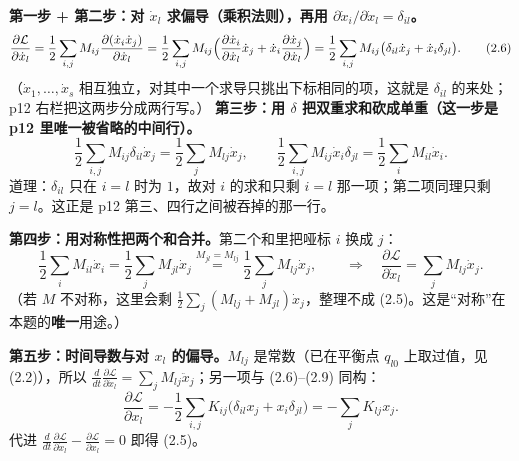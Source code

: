 \documentclass[11pt]{ctexart}
\begin{document}
\textbf{第一步 + 第二步：对 $\dot x_l$ 求偏导（乘积法则），再用 $\partial\dot x_i/\partial\dot x_l=\delta_{il}$。}
\[
\frac{\partial\mathcal{L}}{\partial\dot x_l}
=\frac12\sum_{i,j}M_{ij}\frac{\partial(\dot x_i\dot x_j)}{\partial\dot x_l}
=\frac12\sum_{i,j}M_{ij}\Bigl(\frac{\partial\dot x_i}{\partial\dot x_l}\dot x_j+\dot x_i\frac{\partial\dot x_j}{\partial\dot x_l}\Bigr)
=\frac12\sum_{i,j}M_{ij}\bigl(\delta_{il}\dot x_j+\dot x_i\delta_{jl}\bigr).
\tag{2.6}
\]
（$\dot x_1,\dots,\dot x_s$ 相互独立，对其中一个求导只挑出下标相同的项，这就是 $\delta_{il}$ 的来处；p12 右栏把这两步分成两行写。）
\textbf{第三步：用 $\delta$ 把双重求和砍成单重（这一步是 p12 里唯一被省略的中间行）。}
\[
\frac12\sum_{i,j}M_{ij}\delta_{il}\dot x_j=\frac12\sum_jM_{lj}\dot x_j,\qquad
\frac12\sum_{i,j}M_{ij}\dot x_i\delta_{jl}=\frac12\sum_iM_{il}\dot x_i .
\tag{2.8}
\]
道理：$\delta_{il}$ 只在 $i=l$ 时为 $1$，故对 $i$ 的求和只剩 $i=l$ 那一项；第二项同理只剩 $j=l$。这正是 p12 第三、四行之间被吞掉的那一行。

\textbf{第四步：用对称性把两个和合并。}第二个和里把哑标 $i$ 换成 $j$：
\[
\frac12\sum_iM_{il}\dot x_i=\frac12\sum_jM_{jl}\dot x_j
\overset{M_{jl}=M_{lj}}{=}\frac12\sum_jM_{lj}\dot x_j ,
\qquad
\Longrightarrow\quad
\frac{\partial\mathcal{L}}{\partial\dot x_l}=\sum_jM_{lj}\dot x_j .
\tag{2.9}
\]
（若 $M$ 不对称，这里会剩 $\frac12\sum_j(M_{lj}+M_{jl})\dot x_j$，整理不成 (2.5)。这是“对称”在本题的\textbf{唯一}用途。）

\textbf{第五步：时间导数与对 $x_l$ 的偏导。}$M_{lj}$ 是常数（已在平衡点 $q_{l0}$ 上取过值，见 (2.2)），所以 $\frac{d}{dt}\frac{\partial\mathcal{L}}{\partial\dot x_l}=\sum_jM_{lj}\ddot x_j$；另一项与 (2.6)--(2.9) 同构：
\[
\frac{\partial\mathcal{L}}{\partial x_l}=-\frac12\sum_{i,j}K_{ij}\bigl(\delta_{il}x_j+x_i\delta_{jl}\bigr)=-\sum_jK_{lj}x_j .
\tag{2.10}
\]
代进 $\frac{d}{dt}\frac{\partial\mathcal{L}}{\partial\dot x_l}-\frac{\partial\mathcal{L}}{\partial x_l}=0$ 即得 (2.5)。


\end{document}
